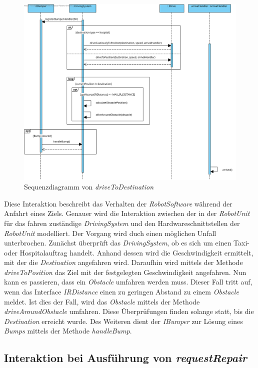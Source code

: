 \begin{figure}[H]
	\centering
	\includegraphics[width=1\textwidth]{img/8-DriveToDestination}
	\caption{Sequenzdiagramm von \emph{driveToDestination}}
	\label{driveToDestinationInteraktion}
\end{figure}
Diese Interaktion beschreibt das Verhalten der \textit{RobotSoftware} während der Anfahrt eines Ziels. Genauer wird die Interaktion zwischen der in der \textit{RobotUnit} für das fahren zuständige \textit{DrivingSystem} und den Hardwareschnittstellen der \textit{RobotUnit} modelliert. Der Vorgang wird duch einen möglichen Unfall unterbrochen. Zunächst überprüft das \textit{DrivingSystem}, ob es sich um einen Taxi- oder Hospitalauftrag handelt. Anhand dessen wird die Geschwindigkeit ermittelt, mit der die \textit{Destination} angefahren wird. Daraufhin wird mittels der Methode \textit{driveToPosition} das Ziel mit der festgelegten Geschwindigkeit angefahren. Nun kann es passieren, dass ein \textit{Obstacle} umfahren werden muss. Dieser Fall tritt auf, wenn das Interface \textit{IRDistance} einen zu geringen Abstand zu einem \textit{Obstacle} meldet. Ist dies der Fall, wird das \textit{Obstacle} mittels der Methode \textit{driveAroundObstacle} umfahren. Diese Überprüfungen finden solange statt, bis die \textit{Destination} erreicht wurde. Des Weiteren dient der \textit{IBumper} zur Lösung eines \textit{Bumps} mittels der Methode \textit{handleBump}.
\\

	
\subsection*{Interaktion bei Ausführung von \textit{requestRepair}}

